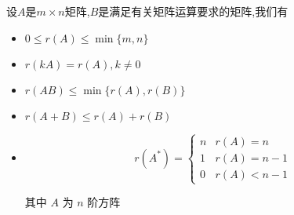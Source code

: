 \begin{corollary}[秩的性质]	
	设$A$是$m\times n$矩阵,$B$是满足有关矩阵运算要求的矩阵,我们有
	\begin{itemize}
		\item $0\leq r(A) \leq \min\{m,n\}$
		\item $r(kA)=r(A), k\neq 0$
		\item $r(AB)\leq \min\{r(A),r(B)\}$
		\item $r(A+B)\leq r(A)+r(B)$
		\item $$ r(A^{*}) = 
		\begin{cases}
			n & r(A) = n\\
			1 & r(A) = n-1\\
			0 & r(A) < n-1	
		\end{cases}$$

		其中 $A$ 为 $n$ 阶方阵
	\end{itemize}
\end{corollary}


